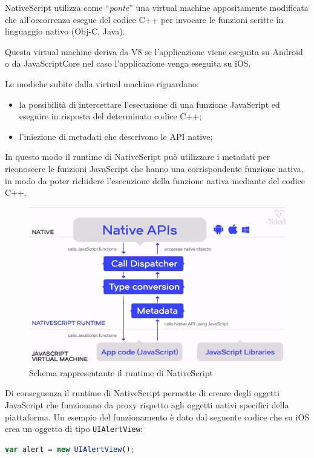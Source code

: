 NativeScript utilizza come ``\textit{ponte}'' una \gls{virtual machine} appositamente modificata che all'occorrenza esegue del codice C++ per invocare le funzioni scritte in linguaggio nativo (Obj-C, Java).

Questa virtual machine deriva da \gls{V8} se l'applicazione viene eseguita su Android o da \gls{JavaScriptCore} nel caso l'applicazione venga eseguita su iOS.

Le modiche subite dalla virtual machine riguardano:
\begin{itemize}
\item la possibilità di intercettare l'esecuzione di una funzione JavaScript ed eseguire in risposta del determinato codice C++;
\item l'iniezione di metadati che descrivono le API native;
\end{itemize} 
In questo modo il runtime di NativeScript può utilizzare i metadati per riconoscere le funzioni JavaScript che hanno una corrispondente funzione nativa, in modo da poter richidere l'esecuzione della funzione nativa mediante del codice C++.

\begin{figure}[htp]
\centering
\includegraphics[width=\textwidth*3/4]{../immagini/ns-runtime}
\caption{Schema rappresentante il runtime di NativeScript}  
\end{figure}
\FloatBarrier

Di conseguenza il runtime di NativeScript permette di creare degli oggetti JavaScript che funzionano da proxy rispetto agli oggetti nativi specifici della piattaforma.
Un esempio del funzionamento è dato dal seguente codice che su iOS crea un oggetto di tipo \texttt{UIAlertView}:

\begin{lstlisting}[language=JavaScript, caption=Esempio di creazione di un oggetto nativo]
var alert = new UIAlertView();
\end{lstlisting}

